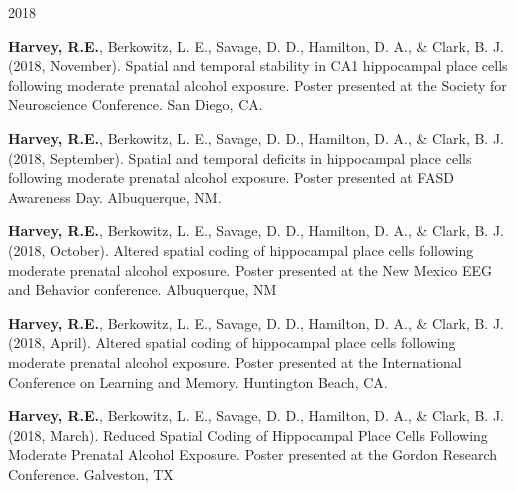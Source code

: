 \begin{cventries}
\cventry
    {} %
    {} %
    {} %
    {2018} %
    {
      \begin{cvitems} %
      \setlength\itemsep{0.35em}
        \item {\textbf{Harvey, R.E.}, Berkowitz, L. E., Savage, D. D., Hamilton, D. A., \& Clark, B. J. (2018, November). Spatial and temporal stability in CA1 hippocampal place cells following moderate prenatal alcohol exposure. Poster presented at the Society for Neuroscience Conference. San Diego, CA.}
        \item {\textbf{Harvey, R.E.}, Berkowitz, L. E., Savage, D. D., Hamilton, D. A., \& Clark, B. J. (2018, September). Spatial and temporal deficits in hippocampal place cells following moderate prenatal alcohol exposure. Poster presented at FASD Awareness Day. Albuquerque, NM.}
        \item {\textbf{Harvey, R.E.}, Berkowitz, L. E., Savage, D. D., Hamilton, D. A., \& Clark, B. J. (2018, October). Altered spatial coding of hippocampal place cells following moderate prenatal alcohol exposure. Poster presented at the New Mexico EEG and Behavior conference. Albuquerque, NM}
        \item {\textbf{Harvey, R.E.}, Berkowitz, L. E., Savage, D. D., Hamilton, D. A., \& Clark, B. J. (2018, April). Altered spatial coding of hippocampal place cells following moderate prenatal alcohol exposure. Poster presented at the International Conference on Learning and Memory. Huntington Beach, CA.}
        \item {\textbf{Harvey, R.E.}, Berkowitz, L. E., Savage, D. D., Hamilton, D. A., \& Clark, B. J. (2018, March). Reduced Spatial Coding of Hippocampal Place Cells Following Moderate Prenatal Alcohol Exposure. Poster presented at the Gordon Research Conference. Galveston, TX}
      \end{cvitems}
    }
\end{cventries}

